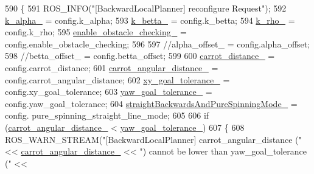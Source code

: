 \begin{DoxyCode}
590         \{
591             ROS\_INFO(\textcolor{stringliteral}{"[BackwardLocalPlanner] reconfigure Request"});
592             \hyperlink{classcl__move__base__z_1_1backward__local__planner_1_1BackwardLocalPlanner_abf7a5a56de2ee41afba7e63c0628ec35}{k\_alpha\_} = config.k\_alpha;
593             \hyperlink{classcl__move__base__z_1_1backward__local__planner_1_1BackwardLocalPlanner_a9f257183d87f1d732cb7e404f09905ad}{k\_betta\_} = config.k\_betta;
594             \hyperlink{classcl__move__base__z_1_1backward__local__planner_1_1BackwardLocalPlanner_ad8a36184bfb011545c751109e23d3b98}{k\_rho\_} = config.k\_rho;
595             \hyperlink{classcl__move__base__z_1_1backward__local__planner_1_1BackwardLocalPlanner_a154043366660cc02ec758dda32817511}{enable\_obstacle\_checking\_} = config.enable\_obstacle\_checking;
596 
597             \textcolor{comment}{//alpha\_offset\_ = config.alpha\_offset;}
598             \textcolor{comment}{//betta\_offset\_ = config.betta\_offset;}
599 
600             \hyperlink{classcl__move__base__z_1_1backward__local__planner_1_1BackwardLocalPlanner_a0bbb80ce5bae865c4322869422803296}{carrot\_distance\_} = config.carrot\_distance;
601             \hyperlink{classcl__move__base__z_1_1backward__local__planner_1_1BackwardLocalPlanner_a63e30befa09c4a67cf55086923b760c7}{carrot\_angular\_distance\_} = config.carrot\_angular\_distance;
602             \hyperlink{classcl__move__base__z_1_1backward__local__planner_1_1BackwardLocalPlanner_aa4ec2c87947a3c08f8278eff052e7c8c}{xy\_goal\_tolerance\_} = config.xy\_goal\_tolerance;
603             \hyperlink{classcl__move__base__z_1_1backward__local__planner_1_1BackwardLocalPlanner_a9c5104d328041fcde5a3c02664abad48}{yaw\_goal\_tolerance\_} = config.yaw\_goal\_tolerance;
604             \hyperlink{classcl__move__base__z_1_1backward__local__planner_1_1BackwardLocalPlanner_a04febb67563add6f715051a94aed1b9b}{straightBackwardsAndPureSpinningMode\_} = config.
      pure\_spinning\_straight\_line\_mode;
605 
606             \textcolor{keywordflow}{if} (\hyperlink{classcl__move__base__z_1_1backward__local__planner_1_1BackwardLocalPlanner_a63e30befa09c4a67cf55086923b760c7}{carrot\_angular\_distance\_} < 
      \hyperlink{classcl__move__base__z_1_1backward__local__planner_1_1BackwardLocalPlanner_a9c5104d328041fcde5a3c02664abad48}{yaw\_goal\_tolerance\_})
607             \{
608                 ROS\_WARN\_STREAM(\textcolor{stringliteral}{"[BackwardLocalPlanner] carrot\_angular\_distance ("} << 
      \hyperlink{classcl__move__base__z_1_1backward__local__planner_1_1BackwardLocalPlanner_a63e30befa09c4a67cf55086923b760c7}{carrot\_angular\_distance\_} << \textcolor{stringliteral}{") cannot be lower than yaw\_goal\_tolerance ("} << 

\end{DoxyCode}
